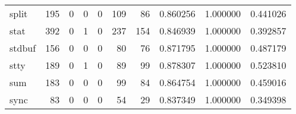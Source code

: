 \begin{tabular}{lrrrrrrrrr}
split     &                                   195 &                                                  0 &                                                  0 &                                                  0 &                                                109 &                                                 86 &                                           0.860256 &                               1.000000 &                             0.441026 \\
stat      &                                   392 &                                                  0 &                                                  1 &                                                  0 &                                                237 &                                                154 &                                           0.846939 &                               1.000000 &                             0.392857 \\
stdbuf    &                                   156 &                                                  0 &                                                  0 &                                                  0 &                                                 80 &                                                 76 &                                           0.871795 &                               1.000000 &                             0.487179 \\
stty      &                                   189 &                                                  0 &                                                  1 &                                                  0 &                                                 89 &                                                 99 &                                           0.878307 &                               1.000000 &                             0.523810 \\
sum       &                                   183 &                                                  0 &                                                  0 &                                                  0 &                                                 99 &                                                 84 &                                           0.864754 &                               1.000000 &                             0.459016 \\
sync      &                                    83 &                                                  0 &                                                  0 &                                                  0 &                                                 54 &                                                 29 &                                           0.837349 &                               1.000000 &                             0.349398 \\

\end{tabular}
